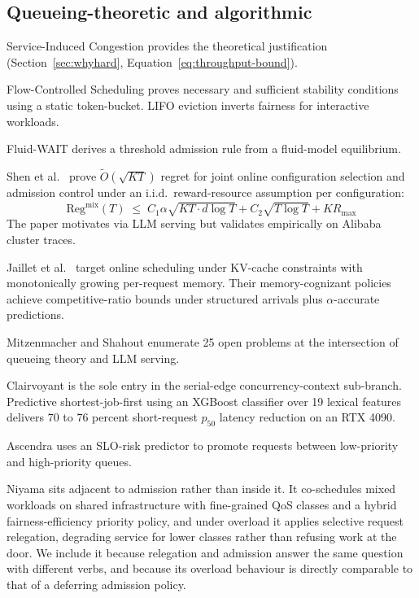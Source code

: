\documentclass[11pt,letterpaper]{article}
\theoremstyle{definition}
\begin{document}
\subsection{Queueing-theoretic and algorithmic}

Service-Induced Congestion \cite{ao2026sic} provides the theoretical
justification (Section~\ref{sec:whyhard},
Equation~\ref{eq:throughput-bound}).

Flow-Controlled Scheduling \cite{dong2026flowcontrolled} proves
necessary and sufficient stability conditions using a static
token-bucket. LIFO eviction inverts fairness for interactive
workloads.

Fluid-WAIT \cite{ao2025fluidwait} derives a threshold admission rule
from a fluid-model equilibrium.

Shen et al.\ \cite{shen2026twolayer} prove $\tilde{O}(\sqrt{K T})$
regret for joint online configuration selection and admission control
under an i.i.d.\ reward-resource assumption per configuration:
%
\begin{equation}
\text{Reg}^{\text{mix}}(T) \;\le\; C_1 \alpha \sqrt{K T \cdot d \log T} + C_2 \sqrt{T \log T} + K R_{\max}
\label{eq:shen-regret}
\end{equation}
%
The paper motivates via LLM serving but validates empirically on
Alibaba cluster traces.

Jaillet et al.\ \cite{jaillet2026online} target online scheduling
under KV-cache constraints with monotonically growing per-request
memory. Their memory-cognizant policies achieve competitive-ratio
bounds under structured arrivals plus $\alpha$-accurate predictions.

Mitzenmacher and Shahout \cite{mitzenmacher2025queueing} enumerate 25
open problems at the intersection of queueing theory and LLM serving.

Clairvoyant \cite{sundaresan2026clairvoyant} is the sole entry in the
serial-edge concurrency-context sub-branch. Predictive
shortest-job-first using an XGBoost classifier over 19 lexical
features delivers 70 to 76 percent short-request $p_{50}$ latency
reduction on an RTX 4090.

Ascendra \cite{elnikety2025ascendra} uses an SLO-risk predictor to
promote requests between low-priority and high-priority queues.

Niyama \cite{goel2025niyama} sits adjacent to admission rather than
inside it. It co-schedules mixed workloads on shared infrastructure with
fine-grained QoS classes and a hybrid fairness-efficiency priority
policy, and under overload it applies selective request relegation,
degrading service for lower classes rather than refusing work at the
door. We include it because relegation and admission answer the same
question with different verbs, and because its overload behaviour is
directly comparable to that of a deferring admission policy.
\end{document}

